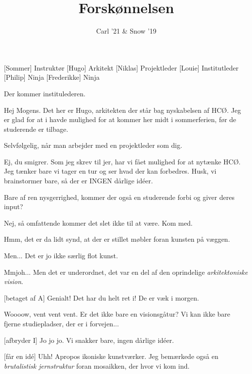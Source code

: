 \documentclass[a4paper,11pt]{article}
\title{Forskønnelsen}
\author{Carl '21 \& Snow '19}
\begin{document}
\maketitle

\begin{roles}
[Sommer] Instruktør
[Hugo] Arkitekt
[Niklas] Projektleder
[Louie] Institutleder
[Philip] Ninja
[Frederikke] Ninja
\end{roles}

\begin{sketch}

 Der kommer institulederen.


 Hej Mogens. Det her er Hugo, arkitekten der står bag nyskabelsen af HCØ. Jeg er glad for at i havde mulighed for at kommer her midt i sommerferien, før de studerende er tilbage.

 Selvfølgelig, når man arbejder med en projektleder som dig.

 Ej, du smigrer. Som jeg skrev til jer, har vi fået mulighed for at nytænke HCØ. Jeg tænker bare vi tager en tur og ser hvad der kan forbedres. Husk, vi brainstormer bare, så der er INGEN dårlige idéer. 

 Bare af ren nysgerrighed, kommer der også en studerende forbi og giver deres input?

 Nej, så omfattende kommer det slet ikke til at være. Kom med.


 Hmm, det er da lidt synd, at der er stillet møbler foran kunsten på væggen.

 Men... Det er jo ikke særlig flot kunst.

 Mmjoh... Men det er underordnet, det var en del af den oprindelige \textit{arkitektoniske vision}.

[betaget af A] Genialt! Det har du helt ret i! De er væk i morgen. 

 Woooow, vent vent vent. Er det ikke bare en visionsgåtur? Vi kan ikke bare fjerne studiepladser, der er i forvejen...

[afbryder I] Jo jo jo. Vi snakker bare, ingen dårlige idéer. 

[får en idé] Uhh! Apropos ikoniske kunstværker. Jeg bemærkede også en \textit{brutalistisk jernstruktur} foran mosaikken, der hvor vi kom ind.


\end{sketch}
\end{document}
